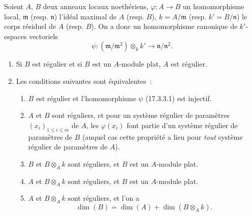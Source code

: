 \begin{proposition}[17.3.3]
\label{0.17.3.3-fr}
Soient $A$, $B$ deux anneaux locaux noethériens,
$\varphi:A\longrightarrow B$ un homomorphisme local, $\mathfrak{m}$ \textup{(resp.
$\mathfrak{n}$)} l'idéal maximal de $A$ \textup{(resp. $B$)},
$k=A/\mathfrak{m}$ \textup{(resp. $k'=B/\mathfrak{n}$)} le corps résiduel de $A$
\textup{(resp. $B$)}. On a donc un homomorphisme canonique de $k'$-espaces vectoriels
\begin{equation}
\label{0.17.3.3.1-fr}
\tag{17.3.3.1}
  \psi:(\mathfrak{m}/\mathfrak{m}^2)\otimes_k k'
  \longrightarrow\mathfrak{n}/\mathfrak{n}^2.
\end{equation}
\begin{enumerate}
  \item[\rm (i)] Si $B$ est régulier et si $B$ est un $A$-module plat, $A$
  est régulier.
  \item[\rm (ii)] Les conditions suivantes sont équivalentes~:
  \begin{enumerate}
    \item[\textit{a)}] $B$ est régulier et l'homomorphisme $\psi$ \textup{(17.3.3.1)} est
    injectif.
    \item[\textit{b)}] $A$ et $B$ sont réguliers, et pour un système régulier de
    paramètres $(x_i)_{1\leq i\leq m}$ de $A$, les $\varphi(x_i)$ font partie
    d'un système régulier de paramètres de $B$ \textup{(auquel cas cette propriété a
    lieu pour \emph{tout} système régulier de paramètres de $A$)}.
    \item[\textit{c)}] $B$ et $B\otimes_A k$ sont réguliers, et $B$ est un
    $A$-module plat.
    \item[\textit{d)}] $A$ et $B\otimes_A k$ sont réguliers, et $B$ est un
    $A$-module plat.
    \item[\textit{e)}] $A$ et $B\otimes_A k$ sont réguliers, et l'on a
    \begin{equation}
    \label{0.17.3.3.2-fr}
    \tag{17.3.3.2}
      \dim(B)=\dim(A)+\dim(B\otimes_A k).
    \end{equation}
  \end{enumerate}
\end{enumerate}
\end{proposition}


